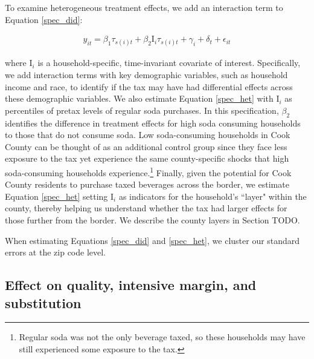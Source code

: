 \documentclass[12pt]{article}
\begin{document}
To examine heterogeneous treatment effects, we add an interaction term to Equation \ref{spec_did}:

\begin{align}
	y_{it} = \beta_1 \tau_{s(i)t} + \beta_2 \text{I}_{i} \tau_{s(i)t} + \gamma_i + \delta_t + \epsilon_{it} \label{spec_het}
\end{align}

where $\text{I}_{i}$ is a household-specific, time-invariant covariate of interest. Specifically, we add interaction terms with key demographic variables, such as household income and race, to identify if the tax may have had differential effects across these demographic variables. We also estimate Equation \ref{spec_het} with $\text{I}_{i}$ as percentiles of pretax levels of regular soda purchases. In this specification, $\beta_2$ identifies the difference in treatment effects for high soda consuming households to those that do not consume soda. Low soda-consuming households in Cook County can be thought of as an additional control group since they face less exposure to the tax yet experience the same county-specific shocks that high soda-consuming households experience.\footnote{Regular soda was not the only beverage taxed, so these households may have still experienced some exposure to the tax.} Finally, given the potential for Cook County residents to purchase taxed beverages across the border, we estimate Equation \ref{spec_het} setting $\text{I}_{i}$ as indicators for the household's ``layer" within the county, thereby helping us understand whether the tax had larger effects for those further from the border. We describe the county layers in Section TODO.

When estimating Equations \ref{spec_did} and \ref{spec_het}, we cluster our standard errors at the zip code level.


\subsection{Effect on quality, intensive margin, and substitution}
\end{document}
